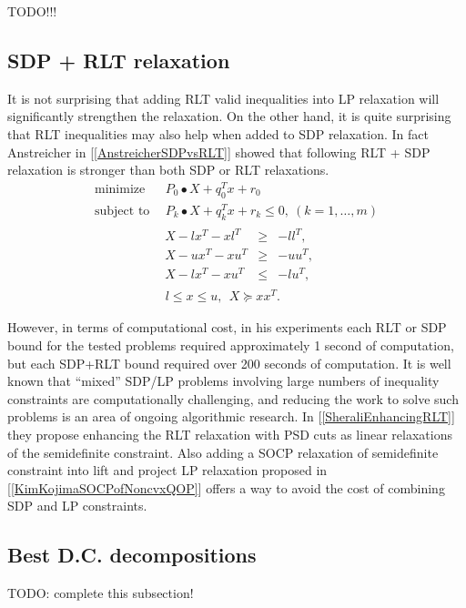 \documentclass[12pt]{book}
\theoremstyle{definition}
\begin{document}
TODO!!!



\subsection{SDP + RLT relaxation}
It is not surprising that adding RLT valid inequalities into LP relaxation will significantly strengthen the relaxation. 
On the other hand, it is quite surprising that RLT inequalities may also help when added to SDP relaxation. 
In fact Anstreicher in [\ref{AnstreicherSDPvsRLT}] showed that following RLT + SDP relaxation is stronger than both SDP or RLT relaxations.
 \begin{equation}
\label{SDP+RLTrelax1} 
\begin{array}{ll}
\mbox{minimize}&\ \ P_0\bullet X + q_0^Tx + r_0\\
\mbox{subject to}&\ \ P_k\bullet X+ q_k^Tx + r_k \leq 0, \  (k = 1,\dots ,m)\\
		& \begin{array}{lcl}
		 X - lx^T - xl^T & \geq & -ll^T, \\
		 X - ux^T - xu^T & \geq & -uu^T, \\
		 X - lx^T - xu^T & \leq & -lu^T, 
		 \end{array}\\
 		&\ \ l\leq x \leq u, \ \  X \succeq xx^T.
\end{array} 
\end{equation}

However, in terms of computational cost, in his experiments each RLT or SDP bound for the tested problems required approximately 1
second of computation, but each SDP+RLT bound required over 200 seconds of computation. It
is well known that “mixed” SDP/LP problems involving large numbers of inequality constraints
are computationally challenging, and reducing the work to solve such problems is an area of ongoing
algorithmic research. In [\ref{SheraliEnhancingRLT}] they propose enhancing the RLT relaxation with PSD cuts as linear relaxations of the semidefinite constraint. Also adding a SOCP relaxation of semidefinite constraint into lift and project LP relaxation proposed in [\ref{KimKojimaSOCPofNoncvxQOP}] offers a way to avoid the cost of combining SDP and LP constraints.

\subsection{Best D.C. decompositions}
TODO: complete this subsection!
\end{document}
